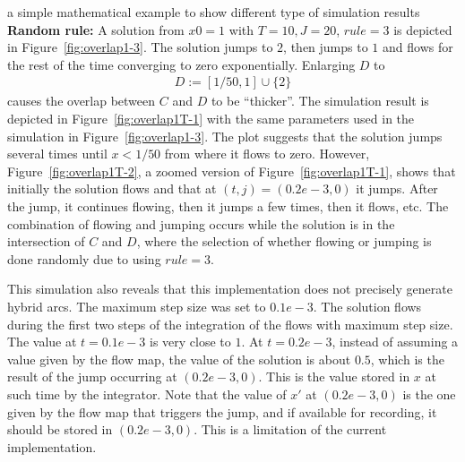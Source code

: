 \begin{example}{a simple mathematical example to show different type of simulation results}
{\bf Random rule:}
A solution from $x0=1$ with $T=10,J=20$, $rule = 3$ is depicted in
Figure~\ref{fig:overlap1-3}. The solution jumps to $2$, then jumps to
$1$ and flows for the rest of the time converging to zero
exponentially.
Enlarging $D$ to
\begin{eqnarray*}
D:=  [1/50,1]\cup\{2\}
\end{eqnarray*}
causes the overlap between $C$ and $D$ to be ``thicker''.
The simulation result is
depicted in Figure~\ref{fig:overlap1T-1}
with the same parameters used in the simulation in
Figure~\ref{fig:overlap1-3}.
The plot suggests that the solution jumps several times until
$x<1/50$ from where it flows to zero.  However,
Figure~\ref{fig:overlap1T-2},
a zoomed version of Figure~\ref{fig:overlap1T-1},
shows that initially the
solution flows and that at $(t,j)=(0.2 e-3,0)$ it jumps. After the jump,
it continues flowing, then it jumps a few times, then it flows, etc.
The combination of flowing and jumping occurs while the solution
is in the intersection of $C$ and $D$, where the selection
of whether flowing or jumping is done randomly due to using $rule=3$.

This simulation also reveals that this implementation does not
precisely generate hybrid arcs. The maximum step size was set to $0.1
e-3$. The solution flows during the first two steps of the integration
of the flows with maximum step size. The value at $t=0.1e-3$ is very
close to $1$. At $t=0.2e-3$, instead of assuming a value given by the
flow map, the value of the solution is about $0.5$, which is the
result of the jump occurring at $(0.2e-3,0)$. This is the value stored
in $x$ at such time by the integrator. Note that the value of $x'$ at
$(0.2e-3,0)$ is the one given by the flow map that triggers the jump,
and if available for recording, it should be stored in $(0.2e-3,0)$.
This is a limitation of the current implementation.


\end{example}
